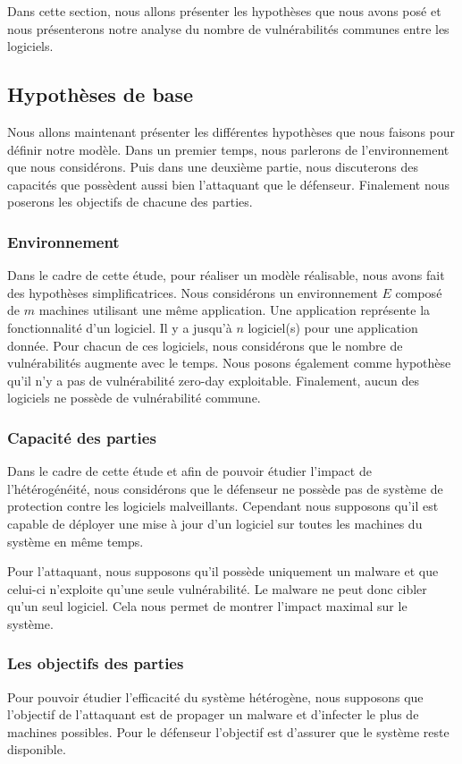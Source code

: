 Dans cette section, nous allons présenter les hypothèses que nous avons posé et nous présenterons notre analyse du nombre de vulnérabilités communes entre les logiciels.

\subsection{Hypothèses de base}\label{sec:hypothese}
Nous allons maintenant présenter les différentes hypothèses que nous faisons pour définir notre modèle.
Dans un premier temps, nous parlerons de l'environnement que nous considérons.
Puis dans une deuxième partie, nous discuterons des capacités que possèdent aussi bien l'attaquant que le défenseur.
Finalement nous poserons les objectifs de chacune des parties.

\subsubsection{Environnement}\label{sec:hypothese:env}
Dans le cadre de cette étude, pour réaliser un modèle réalisable, nous avons fait des hypothèses simplificatrices. Nous considérons un environnement $E$ composé de $m$ machines utilisant une même application.
Une application représente la fonctionnalité d'un logiciel.
Il y a jusqu'à $n$ logiciel(s) pour une application donnée.
Pour chacun de ces logiciels, nous considérons que le nombre de vulnérabilités augmente avec le temps.
Nous posons également comme hypothèse qu'il n'y a pas de vulnérabilité zero-day exploitable.
Finalement, aucun des logiciels ne possède de vulnérabilité commune.


\subsubsection{Capacité des parties}\label{sec:hypothese:capacite}
Dans le cadre de cette étude et afin de pouvoir étudier l'impact de l'hétérogénéité,  nous considérons que le défenseur ne possède pas de système de protection contre les logiciels malveillants.
Cependant nous supposons qu'il est capable de déployer une mise à jour d'un logiciel sur toutes les machines du système en même temps.

Pour l'attaquant, nous supposons qu'il possède uniquement un malware et que celui-ci n'exploite qu'une seule vulnérabilité.
Le malware ne peut donc cibler qu'un seul logiciel.
Cela nous permet de montrer l'impact maximal sur le système.


\subsubsection{Les objectifs des parties}\label{sec:hypothese:objectifs}
Pour pouvoir étudier l'efficacité du système hétérogène, nous supposons que l'objectif de l'attaquant est de propager un malware et d'infecter le plus de machines possibles.
Pour le défenseur l'objectif est d'assurer que le système reste disponible.


